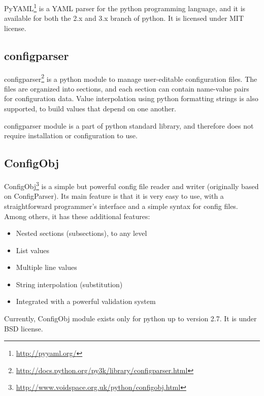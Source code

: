 PyYAML\footnote{\url{http://pyyaml.org/}} is a YAML parser for the python
programming language, and it is available for both the 2.x and 3.x branch of
python. It is licensed under MIT license.

\subsection{configparser}
configparser\footnote{\url{http://docs.python.org/py3k/library/configparser.html}}
is a python module to manage user-editable configuration files. The
files are organized into sections, and each section can contain name-value
pairs for configuration data. Value interpolation using python formatting
strings is also supported, to build values that depend on one another.

configparser module is a part of python standard library, and therefore does
not require installation or configuration to use.

\subsection{ConfigObj}
ConfigObj\footnote{\url{http://www.voidspace.org.uk/python/configobj.html}} is
a simple but powerful config file reader and writer (originally based on
ConfigParser). Its main feature is that it is very easy to use, with a
straightforward programmer's interface and a simple syntax for config files.
Among others, it has these additional features:
\begin{itemize}
	\item Nested sections (subsections), to any level
	\item List values
	\item Multiple line values
	\item String interpolation (substitution)
	\item Integrated with a powerful validation system
\end{itemize}

\noindent Currently, ConfigObj module exists only for python up to version
2.7. It is under BSD license.

